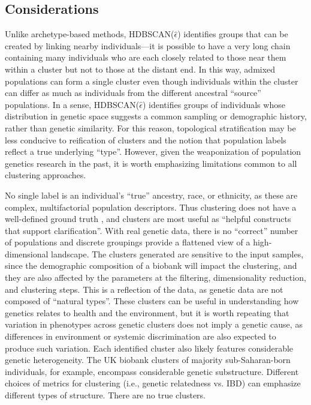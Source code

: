 \subsection{Considerations}

Unlike archetype-based methods, HDBSCAN($\hat{\epsilon}$) identifies groups that can be created by linking nearby individuals---it is possible to have a very long chain containing many individuals who are each closely related to those near them within a cluster but not to those at the distant end. In this way, admixed populations can form a single cluster even though individuals within the cluster can differ as much as individuals from the different ancestral ``source'' populations. In a sense, HDBSCAN($\hat{\epsilon}$) identifies groups of individuals whose distribution in genetic space suggests a common sampling or demographic history, rather than genetic similarity. For this reason, topological stratification may be less conducive to reification of clusters and the notion that population labels reflect a true underlying ``type''.  However, given the weaponization of population genetics research in the past\citep{carlson_counter_2022}, it is worth emphasizing limitations common to all clustering approaches.

No single label is an individual's ``true'' ancestry, race, or ethnicity, as these are complex, multifactorial population descriptors\citep{martschenko_including_2023,roth_multiple_2016}. Thus clustering does not have a well-defined ground truth \citep{ben-david_clustering_2018}, and clusters are most useful as ``helpful constructs that support clarification''\citep{hennig_what_2015}. With real genetic data, there is no ``correct'' number of populations\citep{lawson_tutorial_2018} and discrete groupings provide a flattened view of a high-dimensional landscape\citep{martschenko_including_2023,lewis_getting_2022}. The clusters generated are sensitive to the input samples, since the demographic composition of a biobank will impact the clustering, and they are also affected by the parameters at the filtering, dimensionality reduction, and clustering steps. This is a reflection of the data, as genetic data are not composed of ``natural types''. These clusters can be useful in understanding how genetics relates to health and the environment, but it is worth repeating that variation in phenotypes across genetic clusters does not imply a genetic cause, as differences in environment or systemic discrimination are also expected to produce such variation\citep{vyas_hidden_2020}. Each identified cluster also likely features considerable genetic heterogeneity. The UK biobank clusters of majority sub-Saharan-born individuals, for example, encompass considerable genetic substructure\citep{choudhury_high-depth_2020}. Different choices of metrics for clustering (i.e., genetic relatedness vs. IBD) can emphasize different types of structure. There are no true clusters. 

